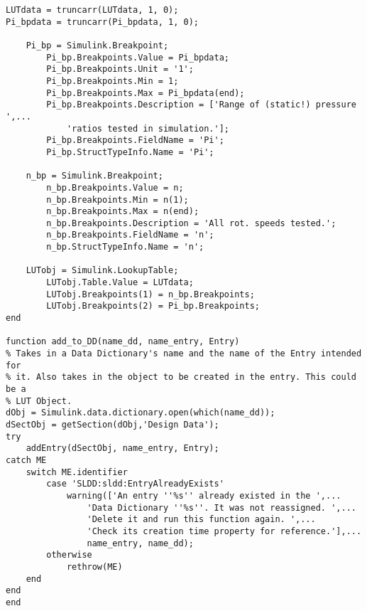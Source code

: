 \begin{lstlisting}
LUTdata = truncarr(LUTdata, 1, 0);
Pi_bpdata = truncarr(Pi_bpdata, 1, 0);

    Pi_bp = Simulink.Breakpoint;
        Pi_bp.Breakpoints.Value = Pi_bpdata;
        Pi_bp.Breakpoints.Unit = '1';
        Pi_bp.Breakpoints.Min = 1;
        Pi_bp.Breakpoints.Max = Pi_bpdata(end);
        Pi_bp.Breakpoints.Description = ['Range of (static!) pressure ',...
            'ratios tested in simulation.'];
        Pi_bp.Breakpoints.FieldName = 'Pi';
        Pi_bp.StructTypeInfo.Name = 'Pi';
        
    n_bp = Simulink.Breakpoint;
        n_bp.Breakpoints.Value = n;
        n_bp.Breakpoints.Min = n(1);
        n_bp.Breakpoints.Max = n(end);
        n_bp.Breakpoints.Description = 'All rot. speeds tested.'; 
        n_bp.Breakpoints.FieldName = 'n';
        n_bp.StructTypeInfo.Name = 'n';
    
    LUTobj = Simulink.LookupTable;
        LUTobj.Table.Value = LUTdata;
        LUTobj.Breakpoints(1) = n_bp.Breakpoints;
        LUTobj.Breakpoints(2) = Pi_bp.Breakpoints;
end

function add_to_DD(name_dd, name_entry, Entry)
% Takes in a Data Dictionary's name and the name of the Entry intended for
% it. Also takes in the object to be created in the entry. This could be a
% LUT Object.
dObj = Simulink.data.dictionary.open(which(name_dd));
dSectObj = getSection(dObj,'Design Data');
try
    addEntry(dSectObj, name_entry, Entry);
catch ME
    switch ME.identifier
        case 'SLDD:sldd:EntryAlreadyExists'
            warning(['An entry ''%s'' already existed in the ',...
                'Data Dictionary ''%s''. It was not reassigned. ',...
                'Delete it and run this function again. ',...
                'Check its creation time property for reference.'],...
                name_entry, name_dd);
        otherwise
            rethrow(ME)
    end
end
end
\end{lstlisting}